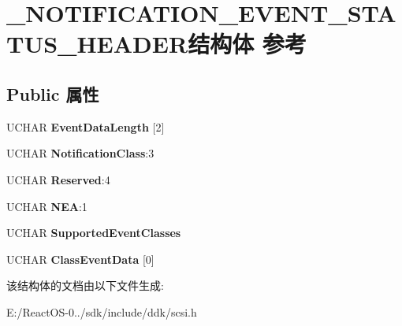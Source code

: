 \hypertarget{struct___n_o_t_i_f_i_c_a_t_i_o_n___e_v_e_n_t___s_t_a_t_u_s___h_e_a_d_e_r}{}\section{\+\_\+\+N\+O\+T\+I\+F\+I\+C\+A\+T\+I\+O\+N\+\_\+\+E\+V\+E\+N\+T\+\_\+\+S\+T\+A\+T\+U\+S\+\_\+\+H\+E\+A\+D\+E\+R结构体 参考}
\label{struct___n_o_t_i_f_i_c_a_t_i_o_n___e_v_e_n_t___s_t_a_t_u_s___h_e_a_d_e_r}
\subsection*{Public 属性}
\begin{DoxyCompactItemize}
\item 
\mbox{\label{struct___n_o_t_i_f_i_c_a_t_i_o_n___e_v_e_n_t___s_t_a_t_u_s___h_e_a_d_e_r_aafcc210c367fa176a628f54469a06e63}} 
U\+C\+H\+AR {\bfseries Event\+Data\+Length} \mbox{[}2\mbox{]}
\item 
\mbox{\label{struct___n_o_t_i_f_i_c_a_t_i_o_n___e_v_e_n_t___s_t_a_t_u_s___h_e_a_d_e_r_aebcbd10fb456443675b6aa155e28c787}} 
U\+C\+H\+AR {\bfseries Notification\+Class}\+:3
\item 
\mbox{\label{struct___n_o_t_i_f_i_c_a_t_i_o_n___e_v_e_n_t___s_t_a_t_u_s___h_e_a_d_e_r_a8df27dc6c0e8e4f4682b1eece83382d2}} 
U\+C\+H\+AR {\bfseries Reserved}\+:4
\item 
\mbox{\label{struct___n_o_t_i_f_i_c_a_t_i_o_n___e_v_e_n_t___s_t_a_t_u_s___h_e_a_d_e_r_adca6c2310e9ad6de8f7c46a190742be4}} 
U\+C\+H\+AR {\bfseries N\+EA}\+:1
\item 
\mbox{\label{struct___n_o_t_i_f_i_c_a_t_i_o_n___e_v_e_n_t___s_t_a_t_u_s___h_e_a_d_e_r_ae8d67995538f8efdb4cbaed38d90ceda}} 
U\+C\+H\+AR {\bfseries Supported\+Event\+Classes}
\item 
\mbox{\label{struct___n_o_t_i_f_i_c_a_t_i_o_n___e_v_e_n_t___s_t_a_t_u_s___h_e_a_d_e_r_a5e8e05cab5a0f74a70b025eb497cf179}} 
U\+C\+H\+AR {\bfseries Class\+Event\+Data} \mbox{[}0\mbox{]}
\end{DoxyCompactItemize}


该结构体的文档由以下文件生成\+:\begin{DoxyCompactItemize}
\item 
E\+:/\+React\+O\+S-\/0../sdk/include/ddk/scsi.\+h\end{DoxyCompactItemize}

